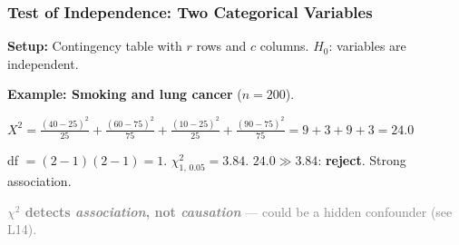 \documentclass[aspectratio=169]{beamer}
\begin{document}
\begin{frame}
\frametitle{Test of Independence: Two Categorical Variables}

\small
\textbf{Setup:} Contingency table with $r$ rows and $c$ columns. $H_0$: variables are independent.

\vspace{0.1cm}
\begin{center}
\end{center}

\pause
\vspace{0.1cm}
\textbf{Example: Smoking and lung cancer} ($n = 200$).

\vspace{0.05cm}
\begin{center}
\end{center}

\vspace{0.02cm}
$X^2 = \frac{(40{-}25)^2}{25} + \frac{(60{-}75)^2}{75} + \frac{(10{-}25)^2}{25} + \frac{(90{-}75)^2}{75} = 9 + 3 + 9 + 3 = \mathbf{24.0}$

\vspace{0.05cm}
df $= (2{-}1)(2{-}1) = 1$. \;$\chi^2_{1,\,0.05} = 3.84$. \;$24.0 \gg 3.84$: \textbf{reject}. Strong association.

\vspace{0.02cm}
{\scriptsize\textcolor{gray}{\textbf{$\chi^2$ detects \emph{association}, not \emph{causation}} --- could be a hidden confounder (see L14).}}
\end{frame}
\end{document}
